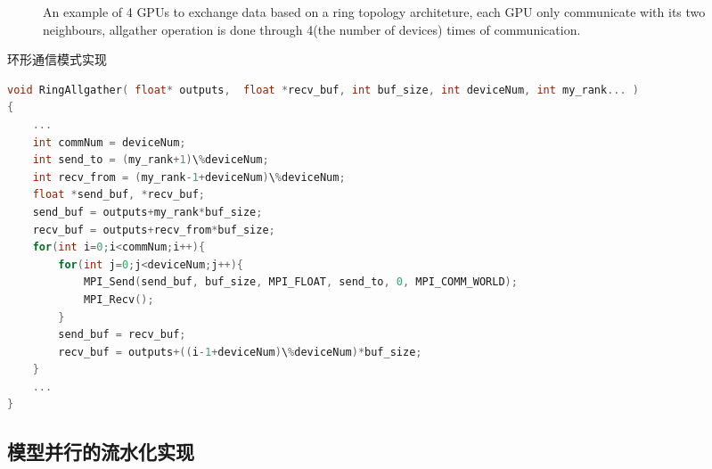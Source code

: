 \begin{figure}[tbh]%
\centering
{}
\caption{An example of 4 GPUs to exchange data based on a ring topology architeture, each GPU only communicate with its two neighbours, allgather operation is done through 4(the number of devices) times of communication.}
\label{allgather}
\end{figure}

\begin{table}
\caption{环形通信模式实现}
\label{ringAllgatherA}
\begin{lstlisting}[language=C++, basicstyle=\ttfamily\footnotesize]
void RingAllgather( float* outputs,  float *recv_buf, int buf_size, int deviceNum, int my_rank... )
{
	...
	int commNum = deviceNum;
	int send_to = (my_rank+1)\%deviceNum;
	int recv_from = (my_rank-1+deviceNum)\%deviceNum;
	float *send_buf, *recv_buf;
	send_buf = outputs+my_rank*buf_size;
	recv_buf = outputs+recv_from*buf_size;
	for(int i=0;i<commNum;i++){	
		for(int j=0;j<deviceNum;j++){
			MPI_Send(send_buf, buf_size, MPI_FLOAT, send_to, 0, MPI_COMM_WORLD);
			MPI_Recv();
		}
		send_buf = recv_buf;
		recv_buf = outputs+((i-1+deviceNum)\%deviceNum)*buf_size;
	}
	...
}
\end{lstlisting}
\end{table}

\subsection{模型并行的流水化实现}



